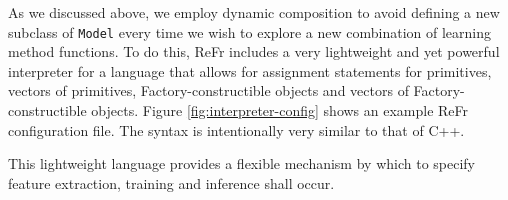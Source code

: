 \documentclass[a4paper]{article}
\begin{document}
As we discussed above, we employ dynamic composition to avoid defining
a new subclass of \texttt{Model} every time we wish to explore a new
combination of learning method functions. To do this, ReFr includes a very lightweight and yet powerful interpreter for a language that allows for assignment statements for primitives, vectors of primitives, Factory-constructible objects and vectors of Factory-constructible objects.  Figure \ref{fig:interpreter-config} shows an example ReFr configuration file. The syntax is intentionally very similar to that of C++.

This lightweight language provides a flexible mechanism by which to specify feature extraction, training and inference shall occur.
\end{document}
